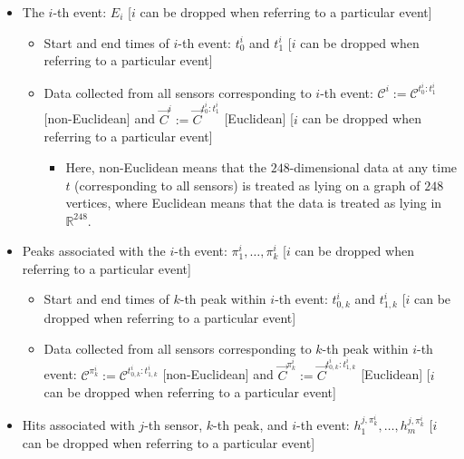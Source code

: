 \documentclass[]{article}
\providecommand{\tightlist}{%
  \setlength{\itemsep}{0pt}\setlength{\parskip}{0pt}}
\begin{document}
\begin{itemize}
\tightlist
\item
  The \(i\)-th event: \(E_i\) {[}\(i\) can be dropped when referring to a particular event{]}

  \begin{itemize}
  \tightlist
  \item
    Start and end times of \(i\)-th event:
    \(t_0^i\) and \(t_1^i\) {[}\(i\) can be dropped when referring to a particular event{]}
  \item
    Data collected from all sensors corresponding to \(i\)-th event:
    \(\mathcal{C}^i := \mathcal{C}^{t_0^i:t_1^i}\) {[}non-Euclidean{]} and
    \(\vec{C}^i := \vec{C}^{t_0^i:t_1^i}\)
    {[}Euclidean{]} {[}\(i\) can be dropped when referring to a particular event{]}

    \begin{itemize}
    \tightlist
    \item
      Here, non-Euclidean means that the \(248\)-dimensional data at any time \(t\) (corresponding to all sensors) is treated as lying on a graph of \(248\) vertices, where Euclidean means that the data is treated as lying in \(\mathbb{R}^{248}\).
    \end{itemize}
  \end{itemize}
\item
  Peaks associated with the \(i\)-th event:
  \(\pi_1^i, \dots, \pi_k^i\) {[}\(i\) can be dropped when referring to a particular event{]}

  \begin{itemize}
  \tightlist
  \item
    Start and end times of \(k\)-th peak within \(i\)-th event:
    \(t_{0,k}^i\) and \(t_{1,k}^i\)
    {[}\(i\) can be dropped when referring to a particular event{]}
  \item
    Data collected from all sensors corresponding to \(k\)-th peak within \(i\)-th event:
    \(\mathcal{C}^{\pi_k^i} := \mathcal{C}^{t_{0,k}^i:t_{1,k}^i}\) {[}non-Euclidean{]} and
    \(\vec{C}^{\pi_k^i} := \vec{C}^{t_{0,k}^i:t_{1,k}^i}\) {[}Euclidean{]}
    {[}\(i\) can be dropped when referring to a particular event{]}
  \end{itemize}
\item
  Hits associated with \(j\)-th sensor, \(k\)-th peak, and \(i\)-th event:
  \(h_1^{j,\pi_k^i}, \dots, h_m^{j,\pi_k^i}\) {[}\(i\) can be dropped when referring to a particular event{]}
\end{itemize}
\end{document}
